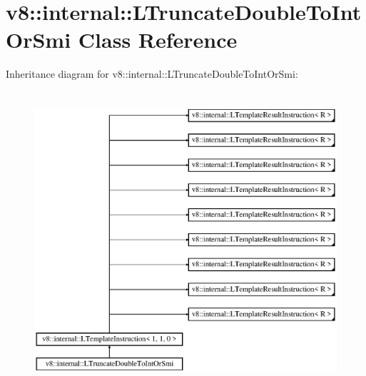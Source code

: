 \hypertarget{classv8_1_1internal_1_1_l_truncate_double_to_int_or_smi}{}\section{v8\+:\+:internal\+:\+:L\+Truncate\+Double\+To\+Int\+Or\+Smi Class Reference}
\label{classv8_1_1internal_1_1_l_truncate_double_to_int_or_smi}
Inheritance diagram for v8\+:\+:internal\+:\+:L\+Truncate\+Double\+To\+Int\+Or\+Smi\+:\begin{figure}[H]
\begin{center}
\leavevmode
\includegraphics[height=11.000000cm]{classv8_1_1internal_1_1_l_truncate_double_to_int_or_smi}
\end{center}
\end{figure}
